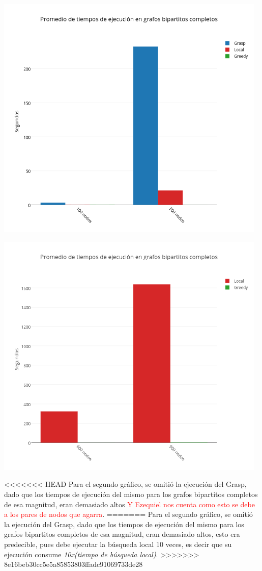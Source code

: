 \begin{center}
 	\includegraphics[width=13cm, keepaspectratio=yes]{imagenes/coliseo/Bipartite1.png}

 	\includegraphics[width=13cm, keepaspectratio=yes]{imagenes/coliseo/Bipartite2.png}
\end{center}

<<<<<<< HEAD
Para el segundo gráfico, se omitió la ejecución del Grasp, dado que los tiempos de ejecución del mismo para los grafos bipartitos completos de esa magnitud, eran demasiado altos 
\textcolor{red}{Y Ezequiel nos cuenta como esto se debe a los pares de nodos que agarra}.
=======
Para el segundo gráfico, se omitió la ejecución del Grasp, dado que los tiempos de ejecución del mismo para los grafos bipartitos completos de esa magnitud, eran demasiado altos, esto era predecible, pues debe ejecutar la b\'usqueda local 10 veces, es decir que su ejecuci\'on consume \textit{10x(tiempo de b\'usqueda local)}.
>>>>>>> 8e16beb30cc5e5a85853803ffadc91069733de28

